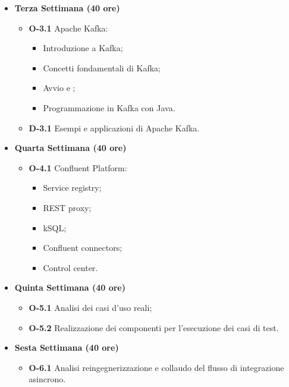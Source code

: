 \begin{itemize}
       \item \textbf{Terza Settimana (40 ore)}
       \begin{itemize}
           \item \textbf{O-3.1} Apache Kafka:
             \begin{itemize}
               \item Introduzione a Kafka;
               \item Concetti fondamentali di Kafka;
               \item Avvio e ;
               \item Programmazione in Kafka con Java.
             \end{itemize}
           \item \textbf{D-3.1} Esempi e applicazioni di Apache Kafka.
       \end{itemize}


       \item \textbf{Quarta Settimana (40 ore)}
       \begin{itemize}
           \item \textbf{O-4.1} Confluent Platform:
             \begin{itemize}
               \item Service registry;
               \item REST proxy;
               \item kSQL;
               \item Confluent connectors;
               \item Control center.
             \end{itemize}
       \end{itemize}

       \item \textbf{Quinta Settimana (40 ore)}
       \begin{itemize}
         \item \textbf{O-5.1} Analisi dei casi d'uso reali;
         \item \textbf{O-5.2} Realizzazione dei componenti per l'esecuzione dei casi di test.
       \end{itemize}

       \item \textbf{Sesta Settimana (40 ore)}
       \begin{itemize}
         \item \textbf{O-6.1} Analisi reingegnerizzazione e collaudo del flusso di integrazione asincrono.
       \end{itemize}


\end{itemize}
